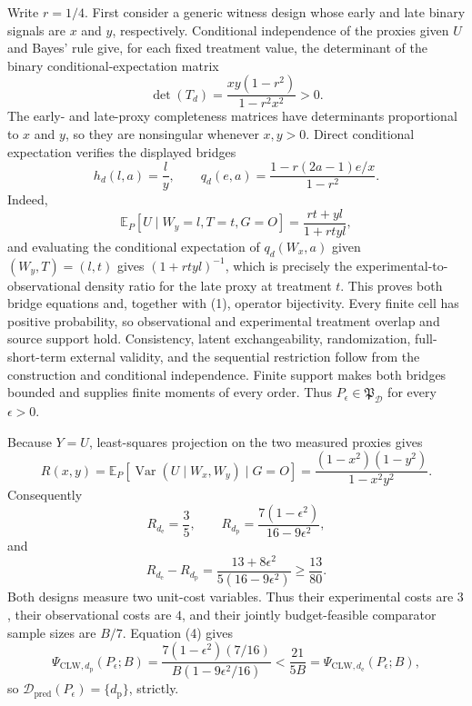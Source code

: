 Write \(r=1/4\).  First consider a generic witness design whose early and late binary signals are \(x\) and \(y\), respectively.  Conditional independence of the proxies given \(U\) and Bayes' rule give, for each fixed treatment value, the determinant of the binary conditional-expectation matrix
\[
 \det(T_d)=\frac{xy(1-r^2)}{1-r^2x^2}>0. \tag{1}
\]
The early- and late-proxy completeness matrices have determinants proportional to \(x\) and \(y\), so they are nonsingular whenever \(x,y>0\).  Direct conditional expectation verifies the displayed bridges
\[
 h_d(l,a)=\frac l y,
 \qquad
 q_d(e,a)=\frac{1-r(2a-1)e/x}{1-r^2}. \tag{2}
\]
Indeed,
\[
 \mathbb E_P[U\mid W_y=l,T=t,G=O]=\frac{rt+yl}{1+rtyl},
\]
and evaluating the conditional expectation of \(q_d(W_x,a)\) given \((W_y,T)=(l,t)\) gives \((1+rtyl)^{-1}\), which is precisely the experimental-to-observational density ratio for the late proxy at treatment \(t\).  This proves both bridge equations and, together with (1), operator bijectivity.  Every finite cell has positive probability, so observational and experimental treatment overlap and source support hold.  Consistency, latent exchangeability, randomization, full-short-term external validity, and the sequential restriction follow from the construction and conditional independence.  Finite support makes both bridges bounded and supplies finite moments of every order.  Thus \(P_{\epsilon}\in\mathfrak P_{\mathcal D}\) for every \(\epsilon>0\).

Because \(Y=U\), least-squares projection on the two measured proxies gives
\[
 R(x,y)=\mathbb E_P[\operatorname{Var}(U\mid W_x,W_y)\mid G=O]
 =\frac{(1-x^2)(1-y^2)}{1-x^2y^2}. \tag{3}
\]
Consequently
\[
 R_{d_{\mathrm e}}=\frac35,
 \qquad
 R_{d_{\mathrm p}}=\frac{7(1-\epsilon^2)}{16-9\epsilon^2},
\]
and
\[
 R_{d_{\mathrm e}}-R_{d_{\mathrm p}}
 =\frac{13+8\epsilon^2}{5(16-9\epsilon^2)}\ge\frac{13}{80}. \tag{4}
\]
Both designs measure two unit-cost variables.  Thus their experimental costs are \(3\), their observational costs are \(4\), and their jointly budget-feasible comparator sample sizes are \(B/7\).  Equation (4) gives
\[
 \Psi_{\mathrm{CLW},d_{\mathrm p}}(P_{\epsilon};B)
 =\frac{7(1-\epsilon^2)(7/16)}{B(1-9\epsilon^2/16)}
 <\frac{21}{5B}
 =\Psi_{\mathrm{CLW},d_{\mathrm e}}(P_{\epsilon};B),
\]
so \(\mathcal D_{\mathrm{pred}}(P_{\epsilon})=\{d_{\mathrm p}\}\), strictly.

